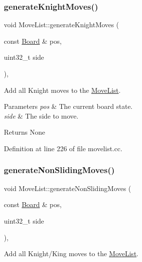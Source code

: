 \subsubsection{\texorpdfstring{generate\+Knight\+Moves()}{generateKnightMoves()}}
{\footnotesize\ttfamily void Move\+List\+::generate\+Knight\+Moves (\begin{DoxyParamCaption}\item[{const \mbox{\hyperlink{classBoard}{Board}} \&}]{pos,  }\item[{uint32\+\_\+t}]{side }\end{DoxyParamCaption})\hspace{0.3cm}{\ttfamily [private]}, {\ttfamily [noexcept]}}



Add all Knight moves to the \mbox{\hyperlink{classMoveList}{Move\+List}}. 


\begin{DoxyParams}{Parameters}
{\em pos} & The current board state. \\
\hline
{\em side} & The side to move. \\
\hline
\end{DoxyParams}
\begin{DoxyReturn}{Returns}
None 
\end{DoxyReturn}


Definition at line 226 of file movelist.\+cc.

\mbox{\label{classMoveList_a56da1abbedf5d6c23b1e321740ecfae9}} 
\subsubsection{\texorpdfstring{generate\+Non\+Sliding\+Moves()}{generateNonSlidingMoves()}}
{\footnotesize\ttfamily void Move\+List\+::generate\+Non\+Sliding\+Moves (\begin{DoxyParamCaption}\item[{const \mbox{\hyperlink{classBoard}{Board}} \&}]{pos,  }\item[{uint32\+\_\+t}]{side }\end{DoxyParamCaption})\hspace{0.3cm}{\ttfamily [private]}, {\ttfamily [noexcept]}}



Add all Knight/\+King moves to the \mbox{\hyperlink{classMoveList}{Move\+List}}. 


